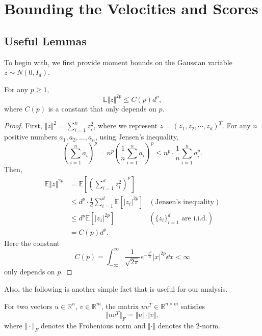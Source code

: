
\section{Bounding the Velocities and Scores}
\label{appendix:lemmas}

\subsection{Useful Lemmas}

To begin with, we first provide moment bounds on the Gaussian variable $z\sim N(0,I_d)$.

\begin{lemma}
    For any $p\ge1$,
    $$\mathbb{E}\Vert z\Vert^{2p}\le C(p)d^p,$$
    where $C(p)$ is a constant that only depends on $p$.
    \label{lem:moment-z}
\end{lemma}

\begin{proof}
    First, $\Vert z\Vert^2=\sum_{i=1}^n z_i^2$, where we represent $z=(z_1,z_2,\cdots,z_d)^T$. For any $n$ positive numbers $a_1,a_2,\dots,a_n$, using Jensen's inequality,
    $$\left(\sum_{i=1}^na_i\right)^p=n^p\left(\frac{1}{n}\sum_{i=1}^na_i\right)^p\le n^p\cdot\frac{1}{n}\sum_{i=1}^na_i^p.$$
    Then,
    $$\begin{aligned}
        \mathbb{E}\Vert z\Vert^{2p}&=\mathbb{E}\left[\left(\sum_{i=1}^dz_i^2\right)^p\right]\\
        &\le d^p\cdot\frac{1}{d}\sum_{i=1}^d\mathbb{E}[|z_i|^{2p}]&(\text{Jensen's inequality})\\
        &\le d^p\mathbb{E}\left[|z_1|^{2p}\right]&(\{z_i\}_{i=1}^d\text{ are i.i.d.})\\
        &=C(p)d^p.
    \end{aligned}$$
    Here the constant $$C(p)=\int_{-\infty}^\infty\frac{1}{\sqrt{2\pi}}e^{-\frac{x^2}{2}}|x|^{2p}\dd x<\infty$$
    only depends on $p$.
\end{proof}

Also, the following is another simple fact that is useful for our analysis.

\begin{lemma}
    For two vectors $u\in\mathbb{R}^n$, $v\in\mathbb{R}^m$, the matrix $uv^T\in\mathbb{R}^{n\times m}$ satisfies
    $$\Vert uv^T\Vert_F=\Vert u\Vert\cdot\Vert v\Vert,$$
    where $\Vert\cdot\Vert_F$ denotes the Frobenious norm and $\Vert\cdot\Vert$ denotes the 2-norm.
    \label{f-norm}
\end{lemma}

